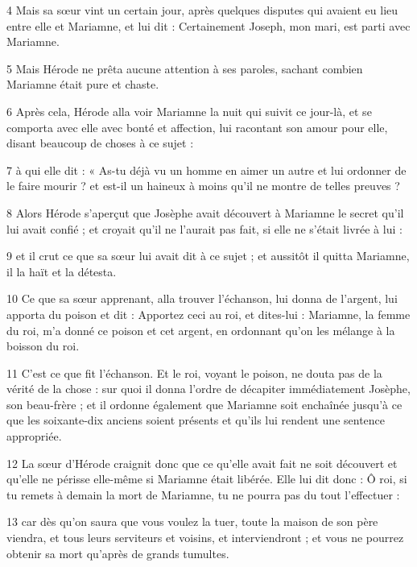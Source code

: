 \par 4 Mais sa sœur vint un certain jour, après quelques disputes qui avaient eu lieu entre elle et Mariamne, et lui dit : Certainement Joseph, mon mari, est parti avec Mariamne.

\par 5 Mais Hérode ne prêta aucune attention à ses paroles, sachant combien Mariamne était pure et chaste.

\par 6 Après cela, Hérode alla voir Mariamne la nuit qui suivit ce jour-là, et se comporta avec elle avec bonté et affection, lui racontant son amour pour elle, disant beaucoup de choses à ce sujet :

\par 7 à qui elle dit : « As-tu déjà vu un homme en aimer un autre et lui ordonner de le faire mourir ? et est-il un haineux à moins qu'il ne montre de telles preuves ?

\par 8 Alors Hérode s'aperçut que Josèphe avait découvert à Mariamne le secret qu'il lui avait confié ; et croyait qu'il ne l'aurait pas fait, si elle ne s'était livrée à lui :

\par 9 et il crut ce que sa sœur lui avait dit à ce sujet ; et aussitôt il quitta Mariamne, il la haït et la détesta.

\par 10 Ce que sa sœur apprenant, alla trouver l'échanson, lui donna de l'argent, lui apporta du poison et dit : Apportez ceci au roi, et dites-lui : Mariamne, la femme du roi, m'a donné ce poison et cet argent, en ordonnant qu'on les mélange à la boisson du roi.

\par 11 C'est ce que fit l'échanson. Et le roi, voyant le poison, ne douta pas de la vérité de la chose : sur quoi il donna l'ordre de décapiter immédiatement Josèphe, son beau-frère ; et il ordonne également que Mariamne soit enchaînée jusqu'à ce que les soixante-dix anciens soient présents et qu'ils lui rendent une sentence appropriée.

\par 12 La sœur d'Hérode craignit donc que ce qu'elle avait fait ne soit découvert et qu'elle ne périsse elle-même si Mariamne était libérée. Elle lui dit donc : Ô roi, si tu remets à demain la mort de Mariamne, tu ne pourra pas du tout l’effectuer :

\par 13 car dès qu'on saura que vous voulez la tuer, toute la maison de son père viendra, et tous leurs serviteurs et voisins, et interviendront ; et vous ne pourrez obtenir sa mort qu'après de grands tumultes.


